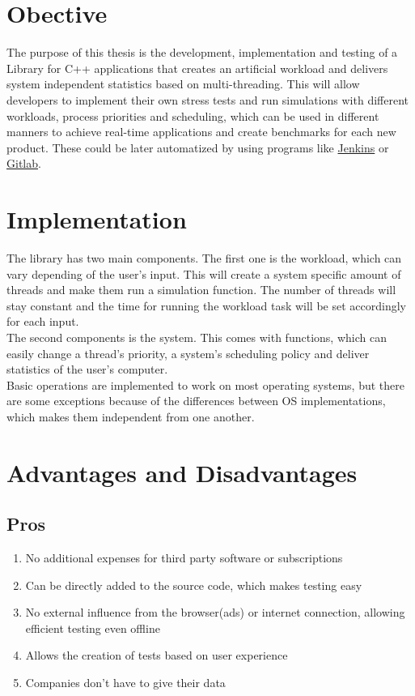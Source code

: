 \section{Obective}
The purpose of this thesis is the development, implementation and testing of a Library for C++ applications that creates an artificial workload and delivers system independent statistics based on multi-threading. This will allow developers to implement their own stress tests and run simulations with different workloads, process priorities and scheduling, which can be used in different manners to achieve real-time applications and create benchmarks for each new product. These could be later automatized by using programs like \href{https://www.jenkins.io/}{Jenkins}\cite{Jenkins} or \href{https://about.gitlab.com/}{Gitlab}\cite{GitLab}.

\section{Implementation}
The library has two main components. The first one is the workload, which can vary depending of the user's input. This will create a system specific amount of threads and make them run a simulation function. The number of threads will stay constant and the time for running the workload task will be set accordingly for each input.\\
The second components is the system. This comes with functions, which can easily change a thread's priority, a system's scheduling policy and deliver statistics of the user's computer.\\
Basic operations are implemented to work on most operating systems, but there are some exceptions because of the differences between OS implementations, which makes them independent from one another.
\section{Advantages and Disadvantages}
\subsection{Pros}
\begin{enumerate}
	\item No additional expenses for third party software or subscriptions
	\item Can be directly added to the source code, which makes testing easy
	\item No external influence from the browser(ads) or internet connection, allowing efficient testing even offline
	\item Allows the creation of tests based on user experience 
	\item Companies don't have to give their data 
\end{enumerate}

